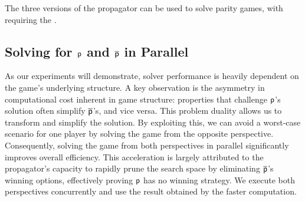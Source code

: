 \documentclass[a4paper,fleqn]{cas-sc}
\begin{document}
The three versions of the \noc propagator can be used to solve parity games, with \nocmemo requiring the \nocchecker.

\subsection{Solving for $\mathsf{p}$ and $\overline{\mathsf{p}}$ in Parallel}\label{sec:parallel}

As our experiments will demonstrate, solver performance is heavily dependent on the game's underlying structure. A key observation is the asymmetry in computational cost inherent in game structure: properties that challenge $\mathsf{p}$'s solution often simplify $\overline{\mathsf{p}}$'s, and vice versa. This problem duality allows us to transform and simplify the solution. By exploiting this, we can avoid a worst-case scenario for one player by solving the game from the opposite perspective. Consequently, solving the game from both perspectives in parallel significantly improves overall efficiency. This acceleration is largely attributed to the \noc propagator's capacity to rapidly prune the search space by eliminating $\overline{\mathsf{p}}$'s winning options, effectively proving $\mathsf{p}$ has no winning strategy. We execute both perspectives concurrently and use the result obtained by the faster computation.
\end{document}
